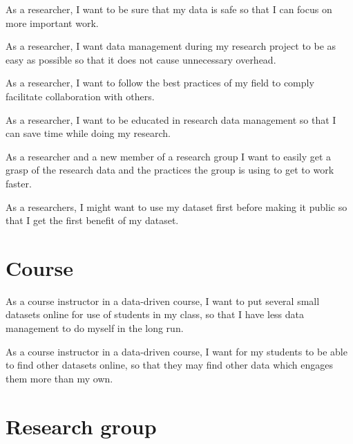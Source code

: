 \begin{compactitem}
    \item As a researcher, I want to be sure that my data is safe so that I can
          focus on more important work.
    \item As a researcher, I want data management during my research project to
          be as easy as possible so that it does not cause unnecessary overhead.
    \item As a researcher, I want to follow the best practices of my field to
          comply facilitate collaboration with others.
    \item As a researcher, I want to be educated in research data management so that
          I can save time while doing my research.
    \item As a researcher and a new member of a research group I want to easily get
          a grasp of the research data and the practices the group is using to get to
          work faster.
    \item As a researchers, I might want to use my dataset first before making it public
          so that I get the first benefit of my dataset.
\end{compactitem}

\section{Course}

\begin{compactitem}
    \item As a course instructor in a data-driven course, I want to put several
          small datasets online for use of students in my class, so that I have
          less data management to do myself in the long run.
    \item As a course instructor in a data-driven course, I want for my students
          to be able to find other datasets online, so that they may find other
          data which engages them more than my own.
\end{compactitem}

\section{Research group}

